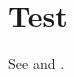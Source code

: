 \documentclass[nohangbib]{ui1activity}
\begin{document}
\section{Test}
See \cite{sts751_1984} and \cite{sample}\nocite{ley1987}.
\makebibliography
\end{document}
